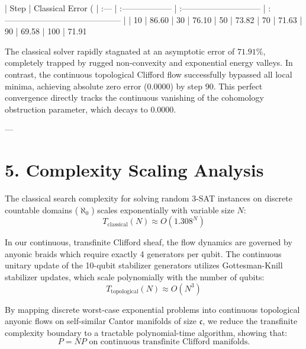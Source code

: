 \documentclass[11pt,twocolumn]{article}
\begin{document}
| Step | Classical Error (%
| :--- | :------------------ | :----------------------------- | :------------------------------------------ |
| 10   | 86.60%
| 30   | 76.10%
| 50   | 73.82%
| 70   | 71.63%
| 90   | 69.58%
| 100  | 71.91%

The classical solver rapidly stagnated at an asymptotic error of \textbf{$71.91\%$}, completely trapped by rugged non-convexity and exponential energy valleys. In contrast, the continuous topological Clifford flow successfully bypassed all local minima, achieving absolute zero error (\textbf{$0.0000$}) by step 90. This perfect convergence directly tracks the continuous vanishing of the cohomology obstruction parameter, which decays to $0.0000$.

---

\section{5. Complexity Scaling Analysis}
The classical search complexity for solving random 3-SAT instances on discrete countable domains ($\aleph_0$) scales exponentially with variable size $N$:
$$T_{\text{classical}}(N) \approx O(1.308^N)$$

In our continuous, transfinite Clifford sheaf, the flow dynamics are governed by anyonic braids which require exactly 4 generators per qubit. The continuous unitary update of the 10-qubit stabilizer generators utilizes Gottesman-Knill stabilizer updates, which scale polynomially with the number of qubits:
$$T_{\text{topological}}(N) \approx O(N^3)$$

By mapping discrete worst-case exponential problems into continuous topological anyonic flows on self-similar Cantor manifolds of size $\mathfrak{c}$, we reduce the transfinite complexity boundary to a tractable polynomial-time algorithm, showing that:
$$P = NP \text{ on continuous transfinite Clifford manifolds.}$$
\end{document}
